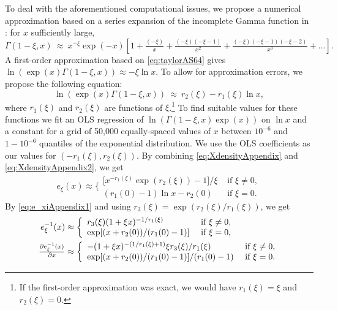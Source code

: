 To deal with the aforementioned computational issues, we propose a numerical approximation based on a series expansion of the incomplete Gamma function in \citet[Page 263]{abramowitz/stegun:1964}: for $x$ sufficiently large,
\begin{equation}
\Gamma (1- \xi,x)~\approx~ x^{- \xi}\exp (-x)[ 1+\tfrac{(- \xi) }{x}+ \tfrac{(- \xi)(- \xi-1)}{x^{2}}+ \tfrac{(- \xi)(- \xi-1)(- \xi-2)}{x^{3}}+\dots ] . \label{eq:taylorAS64}
\end{equation}
A first-order approximation based on \eqref{eq:taylorAS64} gives $\ln (\exp (x)\Gamma (1-\xi ,x))\approx -\xi \ln x$. To allow for approximation errors, we propose the following equation:
\begin{equation}
\ln (\exp (x)\Gamma (1-\xi ,x))~\approx~ r_{2}( \xi ) -r_{1}( \xi ) \ln x, \label{eq:XdensityAppendix2}
\end{equation}
where $r_{1}( \xi )$ and $r_{2}( \xi ) $ are functions of $\xi $.\footnote{If the first-order approximation was exact, we would have $r_{1}( \xi ) = \xi$ and $r_{2}( \xi )=0$.} To find suitable values for these functions we fit an OLS regression of $\ln (\Gamma (1-\xi ,x)\exp (x))$ on $\ln x$ and a constant for a grid of 50,000 equally-spaced values of $x$ between $10^{-6} $ and $1-10^{-6}$ quantiles of the exponential distribution. We use the OLS coefficients as our values for $ (-r_{1}( \xi ) ,r_{2}( \xi ) )$. By combining \eqref{eq:XdensityAppendix} and \eqref{eq:XdensityAppendix2}, we get
\begin{equation}
e_{\xi }(x)\approx \bigg\{ 
\begin{array}{ll}
\lbrack x^{-r_{1}( \xi ) }\exp (r_{2}( \xi ) )-1]/\xi & \text{ if }\xi \neq 0, \\
( r_{1}( 0) -1) \ln x-r_{2}( 0) & \text{ if }\xi =0.
\end{array}
\label{eq:e_xiAppendix1}
\end{equation}
By \eqref{eq:e_xiAppendix1} and using $r_{3}( \xi ) =\exp (r_{2}( \xi ) /r_{1}( \xi ) )$, we get
\begin{align}
e_{\xi }^{-1}(x)&\approx \bigg\{ 
\begin{array}{ll}
r_{3}( \xi ) (1+\xi x)^{-1/r_{1}( \xi ) } & \text{ if } \xi \neq 0, \\
\exp [(x+r_{2}( 0) )/( r_{1}( 0) -1) ] & \text{ if }\xi =0,
\end{array} \notag\\
\tfrac{\partial e_{\xi }^{-1}(x)}{\partial x}&\approx \bigg\{ 
\begin{array}{ll}
-(1+\xi x)^{-( 1/r_{1}( \xi ) +1) }\xi r_{3}( \xi ) /r_{1}( \xi ) & \text{ if }\xi \neq 0, \\
\exp [(x+r_{2}( 0) )/( r_{1}( 0) -1) ]/( r_{1}( 0) -1) & \text{ if }\xi =0.
\end{array} 
\label{eq:e_xiAppendix2}
\end{align}
